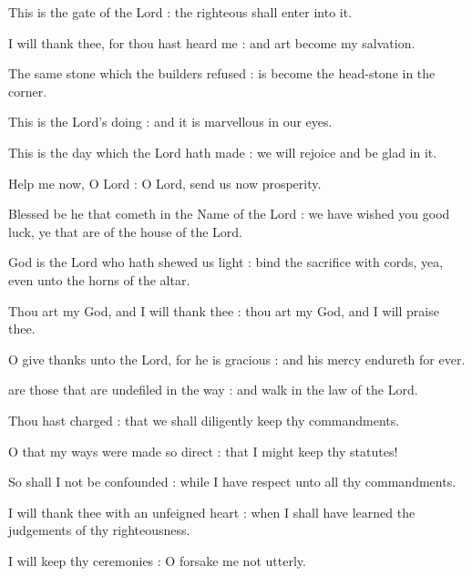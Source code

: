 This is the gate of the Lord : the righteous shall enter into it.\par
{}I will thank thee, for thou hast heard me : and art become my salvation.\par
{}The same stone which the builders refused : is become the head-stone in the corner.\par
{}This is the Lord's doing : and it is marvellous in our eyes.\par
{}This is the day which the Lord hath made : we will rejoice and be glad in it.\par
{}Help me now, O Lord : O Lord, send us now prosperity.\par
{}Blessed be he that cometh in the Name of the Lord : we have wished you good luck, ye that are of the house of the Lord.\par
{}God is the Lord who hath shewed us light : bind the sacrifice with cords, yea, even unto the horns of the altar.\par
{}Thou art my God, and I will thank thee : thou art my God, and I will praise thee.\par
{}O give thanks unto the Lord, for he is gracious : and his mercy endureth for ever.\par



 are those that are undefiled in the way : and walk in the law of the Lord.\par
{}
Thou hast charged : that we shall diligently keep thy commandments.\par
{}O that my ways were made so direct : that I might keep thy statutes!\par
{}So shall I not be confounded : while I have respect unto all thy commandments.\par
{}I will thank thee with an unfeigned heart : when I shall have learned the judgements of thy righteousness.\par
{}I will keep thy ceremonies : O forsake me not utterly.\par

